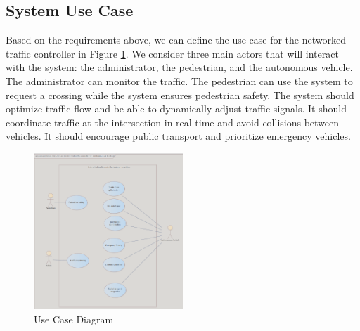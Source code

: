 \subsection{System Use Case}
\label{subsec:use_case}
Based on the requirements above, we can define the use case for the networked traffic controller in Figure \ref{img:main_use_case}. We consider three main actors that will interact with the system: the administrator, the pedestrian, and the autonomous vehicle. The administrator can monitor the traffic. The pedestrian can use the system to request a crossing while the system ensures pedestrian safety. The system should optimize traffic flow and be able to dynamically adjust traffic signals. It should coordinate traffic at the intersection in real-time and avoid collisions between vehicles. It should encourage public transport and prioritize emergency vehicles.
\begin{figure}[ht]
    \centering
    \includegraphics[width=0.5\textwidth]{images/main_use_case.png}
    \caption{Use Case Diagram}
    \label{img:main_use_case}
\end{figure}
